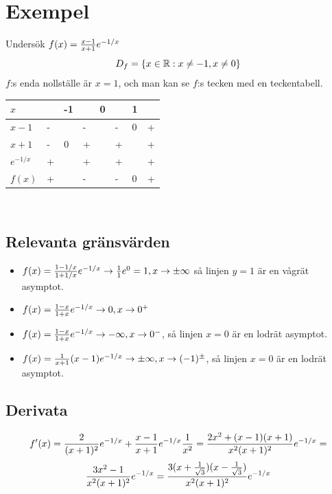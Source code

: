 \documentclass{article}
\begin{document}
\section{Exempel}
Undersök $f(x)=\frac{x-1}{x+1} e^{-1/x}$\\
$$D_f = \{ x\in{\mathbb R} : x\neq -1, x\neq 0 \}$$
$f$:s enda nollställe är $x=1$, och man kan se $f$:s tecken med en teckentabell.

\begin{tabular}{ l | l l l l l l l }
  $x$   &   & -1&   & 0 &   & 1 &   \\\hline
  $x-1$ & - &   & - &   & - & 0 & + \\
  $x+1$ & - & 0 & + &   & + &   & + \\
  $e^{-1/x}$
        & + &   & + & ~ & + &   & +\\\hline
  $f(x)$& + & ~ & - & ~ & - & 0 & +
\end{tabular}\\

\subsection{Relevanta gränsvärden}
\begin{itemize}
  \item $f(x)=\frac{1-1/x}{1+1/x}e^{-1/x} \to \frac{1}{1} e^0 = 1, x\to\pm\infty$ så linjen $y=1$ är en vågrät asymptot.
  \item $f(x)=\frac{1-x}{1+x}e^{-1/x} \to 0, x\to 0^+$
  \item $f(x)=\frac{1-x}{1+x}e^{-1/x} \to -\infty, x\to 0^-$, så linjen $x=0$ är en lodrät asymptot.
  \item $f(x)=\frac{1}{x+1}(x-1)e^{-1/x} \to \pm\infty, x\to (-1)^{\pm}$, så linjen $x=0$ är en lodrät asymptot.
\end{itemize}

\subsection{Derivata}
$$ f'(x) = \frac{2}{(x+1)^2} e^{-1/x} + \frac{x-1}{x+1}e^{-1/x}\frac{1}{x^2} =
\frac{2x^2+(x-1)(x+1)}{x^2(x+1)^2}e^{-1/x}=$$
$$\frac{3x^2-1}{x^2(x+1)^2}e^{-1/x} = \frac{3(x+\frac{1}{\sqrt 3})(x-\frac{1}{\sqrt 3})}{x^2(x+1)^2}e^{-1/x}$$
\end{document}
